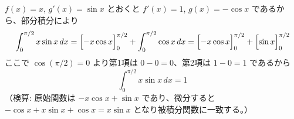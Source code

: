 
$f(x) = x$, $g'(x) = \sin x$ とおくと $f'(x) = 1$, $g(x) = -\cos x$ であるから、部分積分により
\[
\int_{0}^{\pi/2} x\sin x\,dx
= \Bigl[-x\cos x\Bigr]_{0}^{\pi/2} + \int_{0}^{\pi/2} \cos x\,dx
= \Bigl[-x\cos x\Bigr]_{0}^{\pi/2} + \Bigl[\sin x\Bigr]_{0}^{\pi/2}
\]
ここで $\cos(\pi/2) = 0$ より第1項は $0 - 0 = 0$、第2項は $1 - 0 = 1$ であるから
\[
\boxed{\; \int_{0}^{\pi/2} x\sin x\,dx = 1 \;}
\]
（検算: 原始関数は $-x\cos x + \sin x$ であり、微分すると
$-\cos x + x\sin x + \cos x = x\sin x$ となり被積分関数に一致する。）
